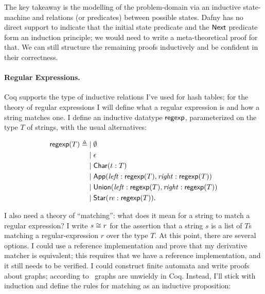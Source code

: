 The key takeaway is the modelling of the problem-domain via an inductive
state-machine and relations (or predicates) between possible states. Dafny has
no direct support to indicate that the initial state predicate and the
\(\mathsf{Next}\) predicate form an induction principle; we would need to write a
meta-theoretical proof for that. We can still structure the remaining proofs
inductively and be confident in their correctness.

\paragraph{Regular Expressions.} Coq supports the type of inductive relations
I've used for hash tables; for the theory of regular expressions I will define
what a regular expression is and how a string matches one. I define an inductive
datatype \(\mathsf{regexp}\), parameterized on the type \(T\) of strings, with the
usual alternatives:

\begin{align*}
    \mathsf{regexp}(T) \triangleq\;
    & |\; \emptyset \\
    & |\; \epsilon \\
    & |\; \mathsf{Char}(t: T) \\
    & |\; \mathsf{App}(\mathit{left}: \mathsf{regexp}(T), \mathit{right}: \mathsf{regexp}(T)) \\
    & |\; \mathsf{Union}(\mathit{left}: \mathsf{regexp}(T), \mathit{right}: \mathsf{regexp}(T)) \\
    & |\; \mathsf{Star}(\mathit{re}: \mathsf{regexp}(T)).
\end{align*}

I also need a theory of ``matching'': what does it mean for a string to match a
regular expression? I write \(s \mathrel{\cong} r\) for the assertion that a string
\(s\) is a list of \(T\)s matching a regular-expression \(r\) over the type
\(T\). At this point, there are several options. I could use a reference
implementation and prove that my derivative matcher is equivalent; this requires
that we have a reference implementation, and it still needs to be verified. I could
construct finite automata and write proofs about graphs; according
to~\cite{Morrisett_2012} graphs are unwieldy in Coq. Instead, I'll stick with
induction and define the rules for matching as an inductive proposition:


